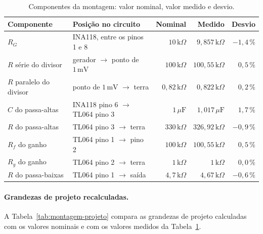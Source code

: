 \documentclass[11pt,a4paper]{article}
\begin{document}
\begin{table}[H]
\centering
\caption{Componentes da montagem: valor nominal, valor medido e desvio.}
\label{tab:montagem-componentes}
\begin{tabular}{@{}llrrr@{}}
\toprule
\textbf{Componente} & \textbf{Posição no circuito} & \textbf{Nominal} & \textbf{Medido} & \textbf{Desvio} \\
\midrule
\(R_G\) & INA118, entre os pinos 1 e 8 & \(10\,\text{k}\Omega\) & \(9{,}857\,\text{k}\Omega\) & \(-1{,}4\,\%\) \\
\(R\) série do divisor & gerador \(\to\) ponto de \(1\,\text{mV}\) & \(100\,\text{k}\Omega\) & \(100{,}55\,\text{k}\Omega\) & \(0{,}5\,\%\) \\
\(R\) paralelo do divisor & ponto de \(1\,\text{mV}\) \(\to\) terra & \(0{,}82\,\text{k}\Omega\) & \(0{,}822\,\text{k}\Omega\) & \(0{,}2\,\%\) \\
\(C\) do passa-altas & INA118 pino 6 \(\to\) TL064 pino 3 & \(1\,\mu\text{F}\) & \(1{,}017\,\mu\text{F}\) & \(1{,}7\,\%\) \\
\(R\) do passa-altas & TL064 pino 3 \(\to\) terra & \(330\,\text{k}\Omega\) & \(326{,}92\,\text{k}\Omega\) & \(-0{,}9\,\%\) \\
\(R_f\) do ganho & TL064 pino 1 \(\to\) pino 2 & \(100\,\text{k}\Omega\) & \(100{,}55\,\text{k}\Omega\) & \(0{,}5\,\%\) \\
\(R_g\) do ganho & TL064 pino 2 \(\to\) terra & \(1\,\text{k}\Omega\) & \(1\,\text{k}\Omega\) & \(0{,}0\,\%\) \\
\(R\) do passa-baixas & TL064 pino 1 \(\to\) saída & \(4{,}7\,\text{k}\Omega\) & \(4{,}67\,\text{k}\Omega\) & \(-0{,}6\,\%\) \\
\bottomrule
\end{tabular}
\end{table}

\paragraph{Grandezas de projeto recalculadas.} A Tabela~\ref{tab:montagem-projeto} compara as grandezas de projeto calculadas com os valores nominais e com os valores medidos da Tabela~\ref{tab:montagem-componentes}.
\end{document}
